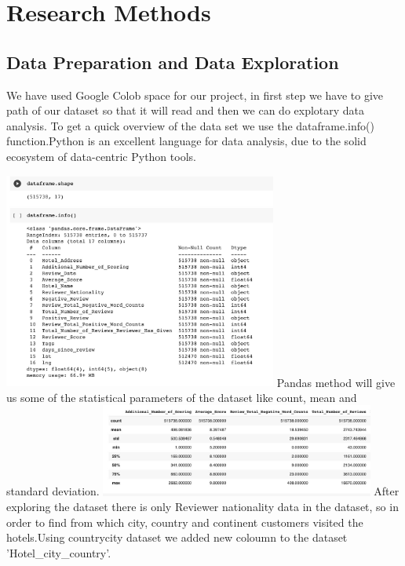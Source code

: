 \section{Research Methods }
\subsection{Data Preparation and Data Exploration}
We have used Google Colob space for our project, in first step we have to give path of our dataset so that it will read and then we can do explotary data analysis. To get a quick overview of the data set we use the dataframe.info() function.Python is an excellent language for data analysis, due
to the solid ecosystem of data-centric Python tools.

\includegraphics[width=9cm, height=6cm \textwidth]{dataframe.jpeg}
Pandas method will give us some of the statistical parameters
of the dataset like count, mean and standard deviation.
\includegraphics[width=9cm, height=6cm \textwidth]{f.jpeg}
After exploring the dataset there is only Reviewer nationality data in the dataset, so in order to find from which city, country and continent customers visited the hotels.Using countrycity dataset we added new coloumn to the dataset 'Hotel\_city\_country'.
